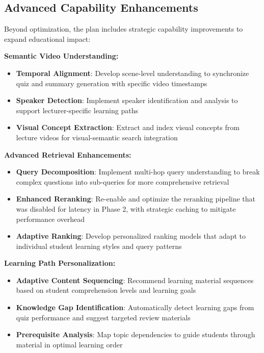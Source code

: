 \subsection{Advanced Capability Enhancements}

Beyond optimization, the plan includes strategic capability improvements to expand educational impact:

\textbf{Semantic Video Understanding:}

\begin{itemize}
    \item \textbf{Temporal Alignment}: Develop scene-level understanding to synchronize quiz and summary generation with specific video timestamps
    \item \textbf{Speaker Detection}: Implement speaker identification and analysis to support lecturer-specific learning paths
    \item \textbf{Visual Concept Extraction}: Extract and index visual concepts from lecture videos for visual-semantic search integration
\end{itemize}

\textbf{Advanced Retrieval Enhancements:}

\begin{itemize}
    \item \textbf{Query Decomposition}: Implement multi-hop query understanding to break complex questions into sub-queries for more comprehensive retrieval
    \item \textbf{Enhanced Reranking}: Re-enable and optimize the reranking pipeline that was disabled for latency in Phase 2, with strategic caching to mitigate performance overhead
    \item \textbf{Adaptive Ranking}: Develop personalized ranking models that adapt to individual student learning styles and query patterns
\end{itemize}

\textbf{Learning Path Personalization:}

\begin{itemize}
    \item \textbf{Adaptive Content Sequencing}: Recommend learning material sequences based on student comprehension levels and learning goals
    \item \textbf{Knowledge Gap Identification}: Automatically detect learning gaps from quiz performance and suggest targeted review materials
    \item \textbf{Prerequisite Analysis}: Map topic dependencies to guide students through material in optimal learning order
\end{itemize}

